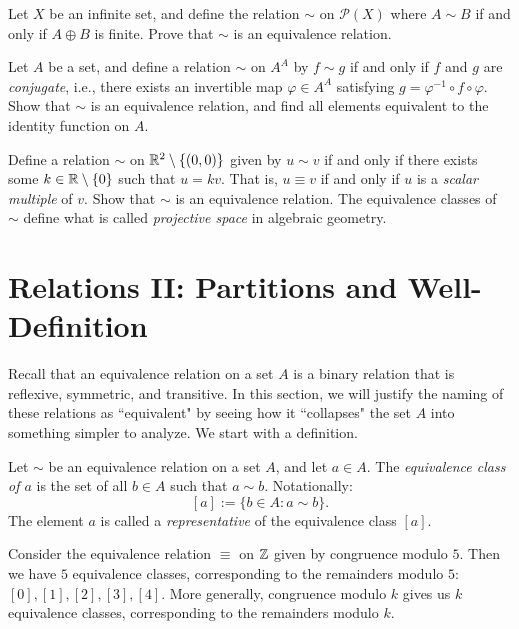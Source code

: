 \documentclass{article}
\begin{document}
\begin{exercise}
Let $X$ be an infinite set, and define the relation $\sim$ on $\mathcal P(X)$ where $A\sim B$ if and only if $A\oplus B$ is finite. Prove that $\sim$ is an equivalence relation.
\end{exercise}
\begin{exercise}
Let $A$ be a set, and define a relation $\sim$ on $A^A$ by $f\sim g$ if and only if $f$ and $g$ are \textit{conjugate}, i.e., there exists an invertible map $\varphi\in A^A$ satisfying $g = \varphi^{-1}\circ f\circ \varphi$. Show that $\sim$ is an equivalence relation, and find all elements equivalent to the identity function on $A$.
\end{exercise}
\begin{exercise}
Define a relation $\sim$ on $\mathbb R^2\setminus \{(0, 0)\}$ given by $u\sim v$ if and only if there exists some $k\in\mathbb R\setminus\{0\}$ such that $u = kv$. That is, $u\equiv v$ if and only if $u$ is a \textit{scalar multiple} of $v$. Show that $\sim$ is an equivalence relation. The equivalence classes of $\sim$ define what is called \textit{projective space} in algebraic geometry.
\end{exercise}

\section{Relations II: Partitions and Well-Definition}
Recall that an equivalence relation on a set $A$ is a binary relation that is reflexive, symmetric, and transitive. In this section, we will justify the naming of these relations as ``equivalent" by seeing how it ``collapses" the set $A$ into something simpler to analyze. We start with a definition. 
\newpage

\begin{definition}
Let $\sim$ be an equivalence relation on a set $A$, and let $a\in A$. The \textit{equivalence class of $a$} is the set of all $b\in A$ such that $a\sim b$. Notationally:
$$[a] := \{b\in A: a\sim b\}.$$
The element $a$ is called a \textit{representative} of the equivalence class $[a]$.
\end{definition}

\begin{example}
Consider the equivalence relation $\equiv$ on $\mathbb Z$ given by congruence modulo $5$. Then we have $5$ equivalence classes, corresponding to the remainders modulo $5$: $[0], [1], [2], [3], [4]$. More generally, congruence modulo $k$ gives us $k$ equivalence classes, corresponding to the remainders modulo $k$.
\end{example}
\end{document}

